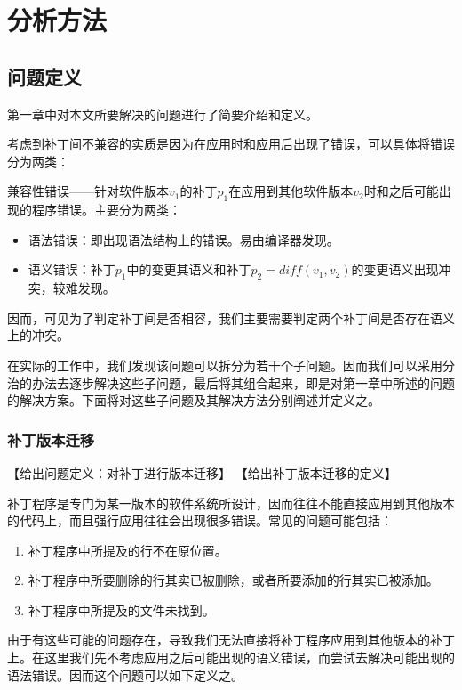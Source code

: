 \chapter{分析方法}
\section{问题定义}
第一章中对本文所要解决的问题进行了简要介绍和定义。

考虑到补丁间不兼容的实质是因为在应用时和应用后出现了错误，可以具体将错误分为两类：

\begin{definition}
	兼容性错误——针对软件版本$v_1$的补丁$p_1$在应用到其他软件版本$v_2$时和之后可能出现的程序错误。主要分为两类：
	\begin{itemize}
		\item 语法错误：即出现语法结构上的错误。易由编译器发现。
		\item 语义错误：补丁$p_1$中的变更其语义和补丁$p_2=diff(v_1,v_2)$的变更语义出现冲突，较难发现。
	\end{itemize}
\end{definition}

因而，可见为了判定补丁间是否相容，我们主要需要判定两个补丁间是否存在语义上的冲突。

在实际的工作中，我们发现该问题可以拆分为若干个子问题。因而我们可以采用分治的办法去逐步解决这些子问题，最后将其组合起来，即是对第一章中所述的问题的解决方案。下面将对这些子问题及其解决方法分别阐述并定义之。

\subsection{补丁版本迁移}

【给出问题定义：对补丁进行版本迁移】
【给出补丁版本迁移的定义】

补丁程序是专门为某一版本的软件系统所设计，因而往往不能直接应用到其他版本的代码上，而且强行应用往往会出现很多错误。常见的问题可能包括：

\begin{enumerate}
	\item 补丁程序中所提及的行不在原位置。
	\item 补丁程序中所要删除的行其实已被删除，或者所要添加的行其实已被添加。
	\item 补丁程序中所提及的文件未找到。
\end{enumerate}

由于有这些可能的问题存在，导致我们无法直接将补丁程序应用到其他版本的补丁上。在这里我们先不考虑应用之后可能出现的语义错误，而尝试去解决可能出现的语法错误。因而这个问题可以如下定义之。

